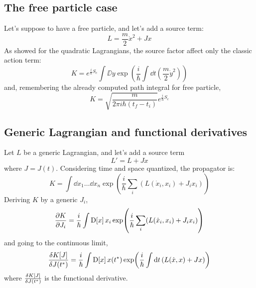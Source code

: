 \documentclass[main.tex]{subfiles}
\begin{document}
\subsection{The free particle case}
Let's suppose to have a free particle, and let's add a source term:
\begin{equation}
L = \frac{m}{2} \dot{x}^2 + Jx
\end{equation}
As showed for the quadratic Lagrangians, the source factor affect only the classic action term:
\begin{equation}
K =  e^{\frac{i}{\hbar} S_c }\int \DD{y} \exp( \frac{i}{\hbar} \int \dd{t} (\frac{m}{2}\dot{y}^2) )
\end{equation}
and, remembering the already computed path integral for free particle,
\begin{equation}
K = \sqrt{\frac{m}{2\pi i \hbar (t_f-t_i)}} e^{\frac{i}{\hbar} S_c }
\end{equation}

\subsection{Generic Lagrangian and functional derivatives}
Let $L$ be a generic Lagrangian, and let's add a source term
\begin{equation}
L' = L + Jx
\end{equation}
where $J=J(t)$. Considering time and space quantized, the propagator is:
\begin{equation}
K = \int \dd{x_1}\dots\dd{x_n} \exp(\frac{i}{\hbar} \sum_i (L(\dot{x}_i,x_i) + J_i x_i) )
\end{equation}
Deriving $K$ by a generic $J_i$,
\begin{equation}
\pdv{K}{J_i} = \frac{i}{\hbar}\int \text{D[$x$]}\, x_i \exp( \frac{i}{\hbar} \sum_i (L(\dot{x}_i,x_i) + J_i x_i) ) 
\end{equation}
and going to the continuous limit,
\begin{equation}
\fdv{K[J]}{J(t^*)} = \frac{i}{\hbar}\int \DD{x} x(t^*) \exp(\frac{i}{\hbar} \int \dd{t} (L(\dot{x},x) + J x) )
\end{equation}
where $\fdv{K[J]}{J(t^*)}$ is the functional derivative.
\end{document}
